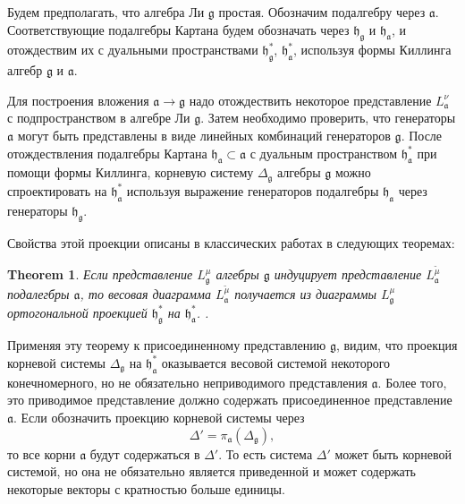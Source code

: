 \documentclass[12pt]{article}
\newtheorem{theorem}{Theorem}
\newcommand{\pia}{\pi_{\mathfrak{a}}}
\newcommand{\gf}{\mathfrak{g}}
\newcommand{\af}{\mathfrak{a}}
\newcommand{\hf}{\mathfrak{h}}
\newcommand{\hfg}{\hf_{\gf}}
\newcommand{\hfa}{\hf_{\af}}
\begin{document}
Будем предполагать, что алгебра Ли $\gf$ простая. Обозначим подалгебру через $\af$. Соответствующие
подалгебры Картана будем обозначать через $\hfg$ и $\hfa$, и отождествим их с дуальными
пространствами $\hfg^{*}$, $\hfa^{*}$, используя формы Киллинга алгебр  $\gf$ и $\af$.

Для построения вложения  $\af\to\gf$ надо отождествить некоторое представление  $L^{\nu}_{\af}$ с
подпространством в алгебре Ли $\gf$. Затем необходимо проверить, что генераторы  $\af$ могут быть
представлены в виде линейных комбинаций генераторов  $\gf$. После отождествления подалгебры Картана
$\hfa\subset \af$ с дуальным пространством $\hfa^{*}$ при помощи формы Киллинга, корневую систему
$\Delta_{\gf}$ алгебры $\gf$ можно спроектировать на  $\hfa^{*}$ используя выражение
генераторов подалгебры $\hfa$ через генераторы  $\hfg$.


Свойства этой проекции описаны в классических работах  \cite{dynkin1952semisimpleru,dynkin1952maximalru} в
следующих теоремах:

\begin{theorem}\label{dyn0}
  Если представление  $L^{\mu}_{\gf}$ алгебры $\gf$ индуцирует представление $L^{\tilde\mu}_{\af}$
  подалегбры $\af$, то весовая диаграмма $L^{\tilde\mu}_{\af}$ получается из диаграммы
  $L^{\mu}_{\gf}$ ортогональной проекцией $\hfg^{*}$ на $\hfa^{*}$.
  \cite{dynkin1952maximalru}. 
\end{theorem} 

Применяя эту теорему к присоединенному представлению  $\gf$, видим, что проекция корневой
системы  $\Delta_{\gf}$ на $\hfa^{*}$ оказывается весовой системой некоторого конечномерного, но не
обязательно неприводимого представления $\af$. Более того, это приводимое представление должно
содержать присоединенное представление $\af$. Если обозначить проекцию корневой системы через
\begin{equation}
  \label{eq:2}
  \Delta'=\pia\left(\Delta_{\gf}\right),
\end{equation}
то все корни $\af$ будут содержаться в $\Delta'$. То есть система  $\Delta'$ может быть корневой
системой, но она не обязательно является приведенной и может содержать некоторые векторы с
кратностью больше единицы.
\end{document}
